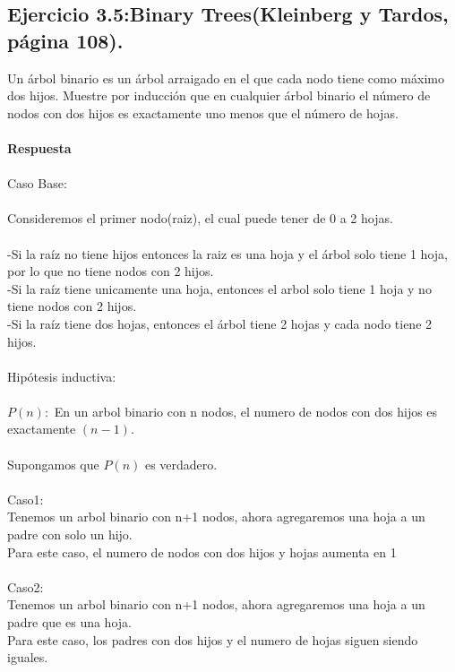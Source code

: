 \documentclass[a4paper,12pt]{article}
\begin{document}
\subsection{Ejercicio 3.5:Binary Trees(Kleinberg y Tardos, página 108).}
Un árbol binario es un árbol arraigado en el que cada nodo tiene como máximo dos hijos. Muestre por inducción que en cualquier árbol binario el número de nodos con dos hijos es exactamente uno menos que el número de hojas.\\\\
\textbf{Respuesta}\\\\
Caso Base:\\\\
Consideremos el primer nodo(raiz), el cual puede tener de 0 a 2 hojas.\\\\
-Si la raíz no tiene hijos entonces la raiz es una hoja y el árbol solo tiene 1 hoja, por lo que no tiene nodos con 2 hijos.\\
-Si la raíz tiene unicamente una hoja, entonces el arbol solo tiene 1 hoja y no tiene nodos con 2 hijos.\\
-Si la raíz tiene dos hojas, entonces el árbol tiene 2 hojas y cada nodo tiene 2 hijos.\\\\
Hipótesis inductiva:\\\\
$P(n):$ En un arbol binario con n nodos, el numero de nodos con dos hijos es exactamente $(n-1)$.
\\\\
Supongamos que $P(n)$ es verdadero.\\\\
Caso1:\\
Tenemos un arbol binario con n+1 nodos, ahora agregaremos una hoja a un padre con solo un hijo.\\
Para este caso, el numero de nodos con dos hijos y hojas aumenta en 1\\\\
Caso2:\\
Tenemos un arbol binario con n+1 nodos, ahora agregaremos una hoja a un padre que es una hoja.\\
Para este caso, los padres con dos hijos y el numero de hojas siguen siendo iguales.
\cite{CourseH}\\\\
\end{document}
